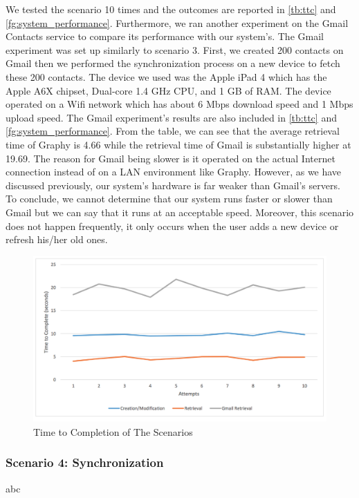 We tested the scenario 10 times and the outcomes are reported in \autoref{tb:ttc} and \autoref{fg:system_performance}. Furthermore, we ran another experiment on the Gmail Contacts service to compare its performance with our system's. The Gmail experiment was set up similarly to scenario 3. First, we created 200 contacts on Gmail then we performed the synchronization process on a new device to fetch these 200 contacts. The device we used was the Apple iPad 4 which has the Apple A6X chipset, Dual-core 1.4 GHz CPU, and 1 GB of RAM. The device operated on a Wifi network which has about 6 Mbps download speed and 1 Mbps upload speed. The Gmail experiment's results are also included in \autoref{tb:ttc} and \autoref{fg:system_performance}. From the table, we can see that the average retrieval time of Graphy is 4.66 while the retrieval time of Gmail is substantially higher at 19.69. The reason for Gmail being slower is it operated on the actual Internet connection instead of on a LAN environment like Graphy. However, as we have discussed previously, our system's hardware is far weaker than Gmail's servers. To conclude, we cannot determine that our system runs faster or slower than Gmail but we can say that it runs at an acceptable speed. Moreover, this scenario does not happen frequently, it only occurs when the user adds a new device or refresh his/her old ones.

\begin{figure}[!h]
\begin{centering}
\includegraphics[scale=0.45]{pics/system_performance.png}
\caption{Time to Completion of The Scenarios}\label{fg:system_performance}
\end{centering}
\end{figure}

\subsubsection{Scenario 4: Synchronization}
abc


